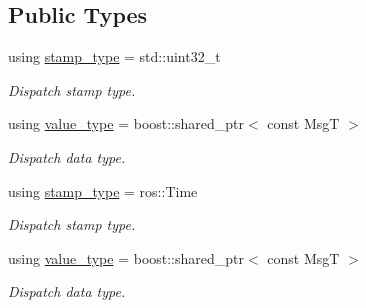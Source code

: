 \subsection*{Public Types}
\begin{DoxyCompactItemize}
\item 
\mbox{\label{structflow_1_1_dispatch_traits_3_01boost_1_1shared__ptr_3_01const_01_msg_t_01_4_01_4_ac273b96fb741fccc6e59755dfd3c6e41}} 
using \hyperlink{structflow_1_1_dispatch_traits_3_01boost_1_1shared__ptr_3_01const_01_msg_t_01_4_01_4_ac273b96fb741fccc6e59755dfd3c6e41}{stamp\+\_\+type} = std\+::uint32\+\_\+t
\begin{DoxyCompactList}\small\item\em Dispatch stamp type. \end{DoxyCompactList}\item 
\mbox{\label{structflow_1_1_dispatch_traits_3_01boost_1_1shared__ptr_3_01const_01_msg_t_01_4_01_4_aa17069d8567e8bd05ac5ebced3b190c1}} 
using \hyperlink{structflow_1_1_dispatch_traits_3_01boost_1_1shared__ptr_3_01const_01_msg_t_01_4_01_4_aa17069d8567e8bd05ac5ebced3b190c1}{value\+\_\+type} = boost\+::shared\+\_\+ptr$<$ const MsgT $>$
\begin{DoxyCompactList}\small\item\em Dispatch data type. \end{DoxyCompactList}\item 
\mbox{\label{structflow_1_1_dispatch_traits_3_01boost_1_1shared__ptr_3_01const_01_msg_t_01_4_01_4_a053ced6a59b8de426b826b910167d7af}} 
using \hyperlink{structflow_1_1_dispatch_traits_3_01boost_1_1shared__ptr_3_01const_01_msg_t_01_4_01_4_a053ced6a59b8de426b826b910167d7af}{stamp\+\_\+type} = ros\+::\+Time
\begin{DoxyCompactList}\small\item\em Dispatch stamp type. \end{DoxyCompactList}\item 
\mbox{\label{structflow_1_1_dispatch_traits_3_01boost_1_1shared__ptr_3_01const_01_msg_t_01_4_01_4_aa17069d8567e8bd05ac5ebced3b190c1}} 
using \hyperlink{structflow_1_1_dispatch_traits_3_01boost_1_1shared__ptr_3_01const_01_msg_t_01_4_01_4_aa17069d8567e8bd05ac5ebced3b190c1}{value\+\_\+type} = boost\+::shared\+\_\+ptr$<$ const MsgT $>$
\begin{DoxyCompactList}\small\item\em Dispatch data type. \end{DoxyCompactList}\end{DoxyCompactItemize}


